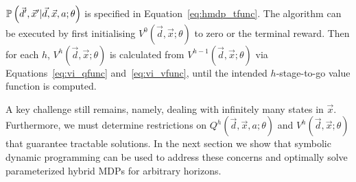 {\footnotesize $\mathbb{P}\left({\vec{d}', \vec{x}' | \vec{d}, \vec{x}, a; \theta}\right)$ } is specified in Equation~\eqref{eq:hmdp_tfunc}. The algorithm can be executed by first initialising {\footnotesize $V^{0}(\vec{d}, \vec{x}; \theta)$}  to zero or the terminal reward. Then for each {\footnotesize$h$}, {\footnotesize $V^{h}(\vec{d}, \vec{x}; \theta)$} is calculated from {\footnotesize $V^{h-1}(\vec{d}, \vec{x}; \theta)$} via Equations~\eqref{eq:vi_qfunc} and~\eqref{eq:vi_vfunc}, until the intended $h$-stage-to-go value function is computed. 



A key challenge still remains, namely, dealing with infinitely many states in {\footnotesize $\vec{x}$}. Furthermore, we must determine restrictions on {\footnotesize $Q^{h}(\vec{d}, \vec{x}, a; \theta)$} and {\footnotesize $V^{h}(\vec{d}, \vec{x}; \theta)$} that guarantee tractable solutions. In the next section we show that symbolic dynamic programming can be used to address these concerns and optimally solve parameterized hybrid MDPs for arbitrary horizons.